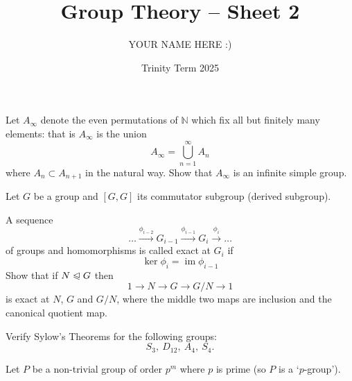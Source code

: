 \documentclass[answers]{exam}
\title{Group Theory -- Sheet 2}
\author{YOUR NAME HERE :)}
\date{Trinity Term 2025}
\let\nsg\trianglelefteqslant%
\begin{document}
\maketitle
\begin{questions}

\question%
Let $A_{\infty}$ denote the even permutations of $\mathbb{N}$ which fix all but finitely many elements: that is $A_{\infty}$ is the union \[
	A_{\infty}=\bigcup_{n=1}^{\infty} A_{n}
\] where $A_{n} \subset A_{n+1}$ in the natural way. Show that $A_{\infty}$ is an infinite simple group.



\question%
Let $G$ be a group and $[G, G]$ its commutator subgroup (derived subgroup).



\question%
A sequence \[
	\ldots \xrightarrow{\phi_{i-2}} G_{i-1} \xrightarrow{\phi_{i-1}} G_{i} \xrightarrow{\phi_{i}} \ldots
\] of groups and homomorphisms is called exact at $G_{i}$ if \[
	\ker \phi_{i}=\operatorname{im} \phi_{i-1}
\] Show that if $N \nsg G$ then \[
	1 \to N \to G \to G / N \to 1
\] is exact at $N$, $G$ and $G / N$, where the middle two maps are inclusion and the canonical quotient map.



\question%
Verify Sylow's Theorems for the following groups: \[
	S_{3},\ D_{12},\ A_{4},\ S_{4} .
\]



\question%
Let $P$ be a non-trivial group of order $p^{m}$ where $p$ is prime (so $P$ is a `$p$-group').
\end{questions}
\end{document}
